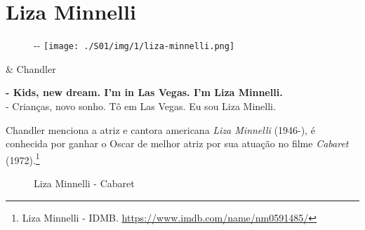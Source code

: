 \hypertarget{liza-minnelli}{%
\section{Liza Minnelli}\label{liza-minnelli}}

\begin{figure}[!ht]
  \begin{adjustwidth}{-\oddsidemargin-1in}{-\rightmargin}
    \centering
    \texttt{[image: ./S01/img/1/liza-minnelli.png]}
  \end{adjustwidth}
\end{figure}

\begin{tcolorbox}[enhanced,center upper,
    drop fuzzy shadow southeast, boxrule=0.3pt,
    lower separated=false,
    colframe=black!30!dialogoBorder,colback=white]
\begin{minipage}[c]{0.16\linewidth}
   & \centering \scriptsize{Chandler}
\end{minipage}
\hfill
\begin{minipage}[c]{0.8\linewidth}
  \textbf{- Kids, new dream. I'm in Las Vegas. I'm Liza Minnelli.}\\
  - Crianças, novo sonho. Tô em Las Vegas. Eu sou Liza Minelli.
\end{minipage}
\end{tcolorbox}

\saveparinfos
\noindent
\begin{minipage}[c]{0.5\textwidth}\useparinfo

Chandler menciona a atriz e cantora americana \emph{Liza Minnelli}
(1946-), é conhecida por ganhar o Oscar de melhor atriz por sua atuação
no filme \emph{Cabaret} (1972).\footnote{\sloppy Liza Minnelli - IDMB. \url{https://www.imdb.com/name/nm0591485/}}

\end{minipage}\hfill
\begin{minipage}[c]{0.5\textwidth}

\begin{figure}
  \centering
    \caption{Liza Minnelli - Cabaret\label{fig:liza-minnelli-cabaret}}
\end{figure}

\end{minipage}
